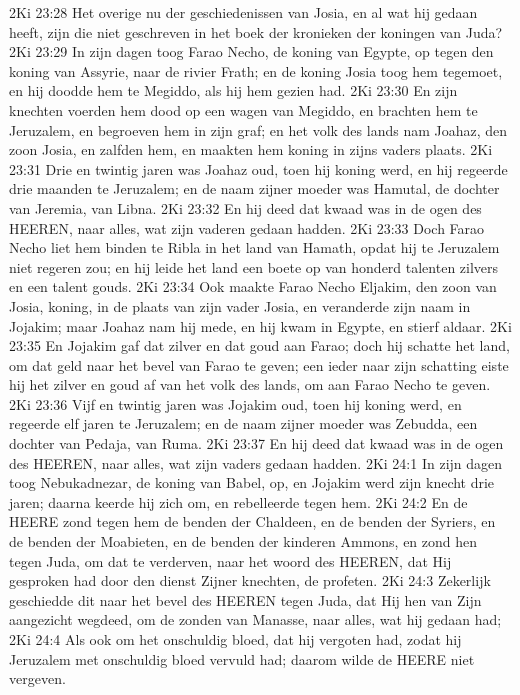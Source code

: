 2Ki 23:28  Het overige nu der geschiedenissen van Josia, en al wat hij gedaan heeft, zijn die niet geschreven in het boek der kronieken der koningen van Juda?
2Ki 23:29  In zijn dagen toog Farao Necho, de koning van Egypte, op tegen den koning van Assyrie, naar de rivier Frath; en de koning Josia toog hem tegemoet, en hij doodde hem te Megiddo, als hij hem gezien had.
2Ki 23:30  En zijn knechten voerden hem dood op een wagen van Megiddo, en brachten hem te Jeruzalem, en begroeven hem in zijn graf; en het volk des lands nam Joahaz, den zoon Josia, en zalfden hem, en maakten hem koning in zijns vaders plaats.
2Ki 23:31  Drie en twintig jaren was Joahaz oud, toen hij koning werd, en hij regeerde drie maanden te Jeruzalem; en de naam zijner moeder was Hamutal, de dochter van Jeremia, van Libna.
2Ki 23:32  En hij deed dat kwaad was in de ogen des HEEREN, naar alles, wat zijn vaderen gedaan hadden.
2Ki 23:33  Doch Farao Necho liet hem binden te Ribla in het land van Hamath, opdat hij te Jeruzalem niet regeren zou; en hij leide het land een boete op van honderd talenten zilvers en een talent gouds.
2Ki 23:34  Ook maakte Farao Necho Eljakim, den zoon van Josia, koning, in de plaats van zijn vader Josia, en veranderde zijn naam in Jojakim; maar Joahaz nam hij mede, en hij kwam in Egypte, en stierf aldaar.
2Ki 23:35  En Jojakim gaf dat zilver en dat goud aan Farao; doch hij schatte het land, om dat geld naar het bevel van Farao te geven; een ieder naar zijn schatting eiste hij het zilver en goud af van het volk des lands, om aan Farao Necho te geven.
2Ki 23:36  Vijf en twintig jaren was Jojakim oud, toen hij koning werd, en regeerde elf jaren te Jeruzalem; en de naam zijner moeder was Zebudda, een dochter van Pedaja, van Ruma.
2Ki 23:37  En hij deed dat kwaad was in de ogen des HEEREN, naar alles, wat zijn vaders gedaan hadden.
2Ki 24:1  In zijn dagen toog Nebukadnezar, de koning van Babel, op, en Jojakim werd zijn knecht drie jaren; daarna keerde hij zich om, en rebelleerde tegen hem.
2Ki 24:2  En de HEERE zond tegen hem de benden der Chaldeen, en de benden der Syriers, en de benden der Moabieten, en de benden der kinderen Ammons, en zond hen tegen Juda, om dat te verderven, naar het woord des HEEREN, dat Hij gesproken had door den dienst Zijner knechten, de profeten.
2Ki 24:3  Zekerlijk geschiedde dit naar het bevel des HEEREN tegen Juda, dat Hij hen van Zijn aangezicht wegdeed, om de zonden van Manasse, naar alles, wat hij gedaan had;
2Ki 24:4  Als ook om het onschuldig bloed, dat hij vergoten had, zodat hij Jeruzalem met onschuldig bloed vervuld had; daarom wilde de HEERE niet vergeven.
